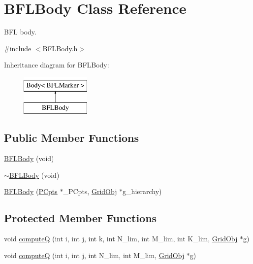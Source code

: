 \hypertarget{class_b_f_l_body}{}\section{B\+F\+L\+Body Class Reference}
\label{class_b_f_l_body}


B\+FL body.  




{\ttfamily \#include $<$B\+F\+L\+Body.\+h$>$}

Inheritance diagram for B\+F\+L\+Body\+:\begin{figure}[H]
\begin{center}
\leavevmode
\includegraphics[height=2.000000cm]{class_b_f_l_body}
\end{center}
\end{figure}
\subsection*{Public Member Functions}
\begin{DoxyCompactItemize}
\item 
\hyperlink{class_b_f_l_body_ab7b3b9f55b59b977401bcf8dead8cfce}{B\+F\+L\+Body} (void)
\item 
\hyperlink{class_b_f_l_body_ad6d343eed8481d8b652261642e184c43}{$\sim$\+B\+F\+L\+Body} (void)
\item 
\hyperlink{class_b_f_l_body_a5dc2907ac609b0fb0a89347b4f66f2ca}{B\+F\+L\+Body} (\hyperlink{class_p_cpts}{P\+Cpts} $\ast$\+\_\+\+P\+Cpts, \hyperlink{class_grid_obj}{Grid\+Obj} $\ast$g\+\_\+hierarchy)
\end{DoxyCompactItemize}
\subsection*{Protected Member Functions}
\begin{DoxyCompactItemize}
\item 
void \hyperlink{class_b_f_l_body_ac220c45e09a037a1f8c596d09d71e3a0}{computeQ} (int i, int j, int k, int N\+\_\+lim, int M\+\_\+lim, int K\+\_\+lim, \hyperlink{class_grid_obj}{Grid\+Obj} $\ast$g)
\item 
void \hyperlink{class_b_f_l_body_a2c98a2521ad9c1a3831a6004f867a307}{computeQ} (int i, int j, int N\+\_\+lim, int M\+\_\+lim, \hyperlink{class_grid_obj}{Grid\+Obj} $\ast$g)
\end{DoxyCompactItemize}
